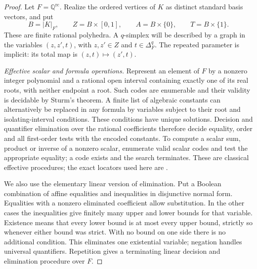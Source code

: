 \begin{proof}
Let $F=\mathbb Q^{\mathrm{rc}}$.  Realize the ordered vertices of $K$
as distinct standard basis vectors, and put
\[
 B=|K|_F,\qquad Z=B\times[0,1],\qquad
 A=B\times\{0\},\qquad T=B\times\{1\}.
\]
These are finite rational polyhedra.  A $q$-simplex will be described
by a graph in the variables $(z,z',t)$, with $z,z'\in Z$ and
$t\in\Delta^q_F$.  The repeated parameter is implicit: its total
map is $(z,t)\mapsto(z',t)$.

\medskip\noindent\textit{Effective scalar and formula operations.}
Represent an element of $F$ by a nonzero integer polynomial and a
rational open interval containing exactly one of its real roots,
with neither endpoint a root.  Such codes are enumerable and their
validity is decidable by Sturm's theorem.  A finite list of algebraic
constants can alternatively be replaced in any formula by variables
subject to their root and isolating-interval conditions.  These
conditions have unique solutions.  Decision and quantifier
elimination over the rational coefficients therefore decide equality,
order and all first-order tests with the encoded constants.
To compute a scalar sum, product or inverse of a nonzero scalar,
enumerate valid scalar codes and test the appropriate equality; a
code exists and the search terminates.  These are classical effective
procedures; the exact locators used here are
\cite[online revision of 26 June 2016, Theorem~2.62, p.~62;
Algorithm~14.16, pp.~586--587; Algorithm~14.21 and Theorem~14.22,
pp.~591--593]{BasuPollackRoy2016Online}.

We also use the elementary linear version of elimination.  Put a
Boolean combination of affine equalities and inequalities in
disjunctive normal form.  Equalities with a nonzero eliminated
coefficient allow substitution.  In the other cases the inequalities
give finitely many upper and lower bounds for that variable.  Existence
means that every lower bound is at most every upper bound, strictly
so whenever either bound was strict.  With no bound on one side
there is no additional condition.  This eliminates one existential
variable; negation handles universal quantifiers.  Repetition gives
a terminating linear decision and elimination procedure over $F$.


\end{proof}
